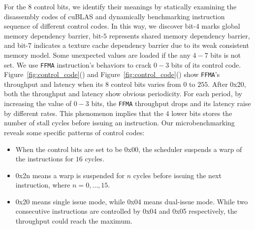 For the $8$ control bits, we identify their meanings by statically examining the disassembly codes of cuBLAS and 
dynamically benchmarking instruction sequence of different control codes.
In this way, we discover bit-$4$ marks global memory dependency barrier, bit-$5$ represents shared memory dependency barrier, and bit-$7$ indicates a texture cache dependency barrier due to its weak consistent memory model. 
Some unexpected values are loaded if the any $4-7$ bits is not set. 
We use {\tt FFMA} instruction's behaviors to crack $0-3$ bits of its control code.
Figure~\ref{fig:control_code}() and 
Figure~\ref{fig:control_code}() show {\tt FFMA}'s throughput and latency  when its $8$ control bits varies from $0$ to $255$. 
After 0x20, both the throughput and latency show obvious periodicity.
For each period, by increasing the value of $0-3$ bits, the {\tt FFMA} throughput drops and its latency raise by different rates. 
This phenomenon implies that the $4$ lower bits stores the number of stall cycles before issuing 
an instruction. 
Our microbenchmarking reveals some specific patterns of control codes:

\begin{itemize}
\item When the control bits are set to be 0x00, the scheduler suspends a warp of the instructions for $16$ cycles.
\item 0x2n means a warp is suspended for $n$ cycles before issuing the next instruction, where $n=0, \dots, 15$.
\item 0x20 means single issue mode, while 0x04 means dual-issue mode. 
While two consecutive instructions are controlled by 0x04 and 0x05 respectively, the throughput could reach the maximum. 
\end{itemize}


